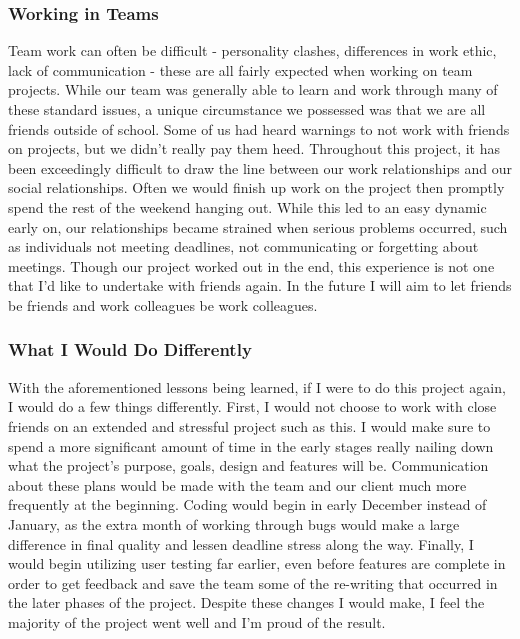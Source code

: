 \documentclass[letterpaper,10pt,titlepage,draftclsnofoot,onecolumn,onesided] {IEEEtran}
\begin{document}
\subsubsection{Working in Teams}
Team work can often be difficult - personality clashes, differences in work ethic, lack of communication - these are all fairly expected when working on team projects. 
While our team was generally able to learn and work through many of these standard issues, a unique circumstance we possessed was that we are all friends outside of school.
Some of us had heard warnings to not work with friends on projects, but we didn't really pay them heed.
Throughout this project, it has been exceedingly difficult to draw the line between our work relationships and our social relationships. 
Often we would finish up work on the project then promptly spend the rest of the weekend hanging out.
While this led to an easy dynamic early on, our relationships became strained when serious problems occurred, such as individuals not meeting deadlines, not communicating or forgetting about meetings.
Though our project worked out in the end, this experience is not one that I'd like to undertake with friends again.
In the future I will aim to let friends be friends and work colleagues be work colleagues. \\

\subsubsection{What I Would Do Differently}
With the aforementioned lessons being learned, if I were to do this project again, I would do a few things differently.
First, I would not choose to work with close friends on an extended and stressful project such as this.
I would make sure to spend a more significant amount of time in the early stages really nailing down what the project's purpose, goals, design and features will be.
Communication about these plans would be made with the team and our client much more frequently at the beginning.
Coding would begin in early December instead of January, as the extra month of working through bugs would make a large difference in final quality and lessen deadline stress along the way.
Finally, I would begin utilizing user testing far earlier, even before features are complete in order to get feedback and save the team some of the re-writing that occurred in the later phases of the project.
Despite these changes I would make, I feel the majority of the project went well and I'm proud of the result.
\end{document}
